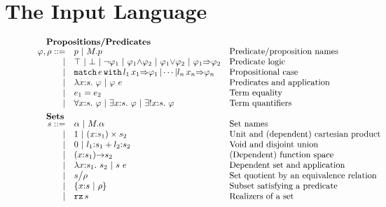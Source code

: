 
\section{The Input Language}
\label{sec:input-language}

\begin{figure}
	\[
	\begin{array}{rl@{\quad}l}
		\noalign{\textbf{Propositions/Predicates}}
		\ip,\ipp ::= 
		    & \iP \ibar \iselect{\im}{\iP}&\mbox{Predicate/proposition names}\\
		  | & \itrue \ | \ \ifalse \ibar \inot{\ip_1} \ibar {\ip_1}{\land}{\ip_2} \ibar 
		       {\ip_1}{\lor}{\ip_2}\ | \ {\ip_1}{\Rightarrow}{\ip_2} & \mbox{Predicate logic}\\
                  | & \ipcases{\ie}{\il_1}{\ix_1}{\ip_1}{\il_n}{\ix_n}{\ip_n} & \mbox{Propositional case}\\
		  | & \ilambda{\ix}{\is}{\ip}  \ibar \iapp{\ip}{\ie} & \mbox{Predicates and application}\\
		  | & \iequal{\ie_1}{\ie_2} & \mbox{Term equality}\\
		  | & \iforall{\ix}{\is}{\ip}  \ibar 
		      \iexists{\ix}{\is}{\ip} \ |\
		      \iunique{\ix}{\is}{\ip} & \mbox{Term quantifiers}\\[5pt]
		
		\noalign{\textbf{Sets}}
		\is ::= 
		    & \iS  \ibar \iselect{\im}{\iS} &\mbox{Set names}\\
		  | & \isunit \ibar \iprod{\ix}{\is_1}{\is_2}
                  &\mbox{Unit and (dependent) cartesian product}\\
		  | & \isvoid \ibar \isum{\il_1}{\is_1}{\il_2}{\is_2} &\mbox{Void and disjoint union}\\
		  | & \idarrow{\ix}{\is_1}{\is_2} & \mbox{(Dependent) function space} \\
		  | & \ilambda{\ix}{\is_1}{\is_2} \ibar 
		      \iapp{\is}{\ie} &\mbox{Dependent set and application}\\
		  | & \iquot{\is}{\ipp} & \mbox{Set quotient by an equivalence relation}\\
		  | & \isubset{\ix}{\is}{\ipp} & \mbox{Subset satisfying a predicate}\\
		  | & \irz{\is}&\mbox{Realizers of a set}\\[5pt] 
		

\end{array}\]
\end{figure}

